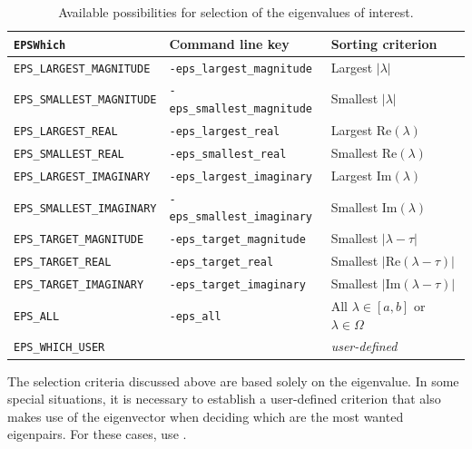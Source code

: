 \begin{table}
\centering
{\small \begin{tabular}{lll}
\texttt{EPSWhich}                  & Command line key                   & Sorting criterion \\\hline
\texttt{EPS\_LARGEST\_MAGNITUDE}   & \texttt{-eps\_largest\_magnitude}  & Largest $|\lambda|$ \\
\texttt{EPS\_SMALLEST\_MAGNITUDE}  & \texttt{-eps\_smallest\_magnitude} & Smallest $|\lambda|$ \\
\texttt{EPS\_LARGEST\_REAL}        & \texttt{-eps\_largest\_real}       & Largest $\mathrm{Re}(\lambda)$ \\
\texttt{EPS\_SMALLEST\_REAL}       & \texttt{-eps\_smallest\_real}      & Smallest $\mathrm{Re}(\lambda)$ \\
\texttt{EPS\_LARGEST\_IMAGINARY}   & \texttt{-eps\_largest\_imaginary}  & Largest $\mathrm{Im}(\lambda)$\footnotemark[1] \\
\texttt{EPS\_SMALLEST\_IMAGINARY}  & \texttt{-eps\_smallest\_imaginary} & Smallest $\mathrm{Im}(\lambda)$\footnotemark[1] \\
\hline
\texttt{EPS\_TARGET\_MAGNITUDE}    & \texttt{-eps\_target\_magnitude}   & Smallest $|\lambda-\tau|$ \\
\texttt{EPS\_TARGET\_REAL}         & \texttt{-eps\_target\_real}        & Smallest $|\mathrm{Re}(\lambda-\tau)|$ \\
\texttt{EPS\_TARGET\_IMAGINARY}    & \texttt{-eps\_target\_imaginary}   & Smallest $|\mathrm{Im}(\lambda-\tau)|$ \\
\texttt{EPS\_ALL}                  & \texttt{-eps\_all}                 & All $\lambda\in[a,b]$ or $\lambda\in\Omega$\\
\hline
\texttt{EPS\_WHICH\_USER}          &                                    & \emph{user-defined} \\\hline
\end{tabular} }
\caption{\label{tab:portion}Available possibilities for selection of the eigenvalues of interest.}
\end{table}


The selection criteria discussed above are based solely on the eigenvalue. In some special situations, it is necessary to establish a user-defined criterion that also makes use of the eigenvector when deciding which are the most wanted eigenpairs. For these cases, use .

